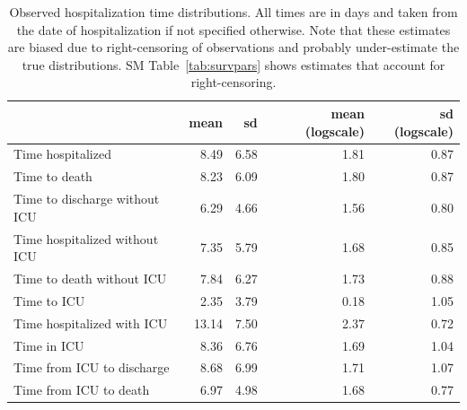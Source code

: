 \begin{table}[t]
\caption{Observed hospitalization time distributions. All times are in days and taken from the date of hospitalization if not specified otherwise. Note that these estimates are biased due to right-censoring of observations and probably under-estimate the true distributions. SM Table~\ref{tab:survpars} shows estimates that account for right-censoring.}
\label{tab:vdparams}
\centering
\begin{tabular}{lrrrr}
\toprule
 & mean & sd & mean (logscale) & sd (logscale)\\
\midrule
Time hospitalized & 8.49 & 6.58 & 1.81 & 0.87\\
Time to death & 8.23 & 6.09 & 1.80 & 0.87\\ \addlinespace
Time to discharge without ICU & 6.29 & 4.66 & 1.56 & 0.80\\
Time hospitalized without ICU & 7.35 & 5.79 & 1.68 & 0.85\\
Time to death without ICU & 7.84 & 6.27 & 1.73 & 0.88\\ \addlinespace
Time to ICU & 2.35 & 3.79 & 0.18 & 1.05\\
Time hospitalized with ICU & 13.14 & 7.50 & 2.37 & 0.72\\
Time in ICU & 8.36 & 6.76 & 1.69 & 1.04\\
Time from ICU to discharge & 8.68 & 6.99 & 1.71 & 1.07\\
Time from ICU to death & 6.97 & 4.98 & 1.68 & 0.77\\
\bottomrule
\end{tabular}
\end{table}


